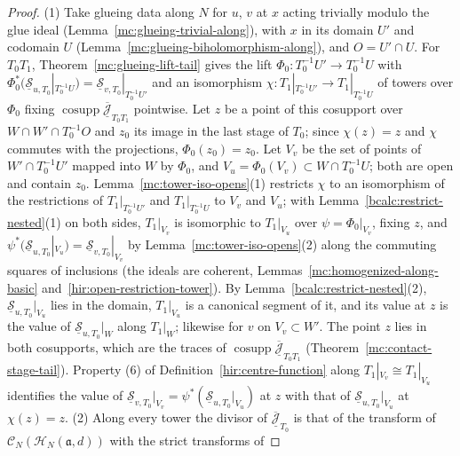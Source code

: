 \begin{proof}
\leanok
(1) Take glueing data along \(N\) for \(u\), \(v\) at \(x\) acting trivially modulo the glue ideal (Lemma~\ref{mc:glueing-trivial-along}), with \(x\) in its domain \(U'\) and
codomain \(U\) (Lemma~\ref{mc:glueing-biholomorphism-along}), and \(O=U'\cap U\). For \(T_0T_1\), Theorem~\ref{mc:glueing-lift-tail} gives the lift
\(\Phi_0\colon T_0^{-1}U'\to T_0^{-1}U\) with \(\Phi_0^*(\underline{\mathcal S}_{u,T_0}|_{T_0^{-1}U})=\underline{\mathcal S}_{v,T_0}|_{T_0^{-1}U'}\) and an isomorphism
\(\chi\colon T_1|_{T_0^{-1}U'}\to T_1|_{T_0^{-1}U}\) of towers over \(\Phi_0\) fixing \(\operatorname{cosupp}\overline{\underline{\mathcal J}}_{T_0T_1}\) pointwise. Let \(z\) be a
point of this cosupport over \(W\cap W'\cap T_0^{-1}O\) and \(z_0\) its image in the last stage of \(T_0\); since \(\chi(z)=z\) and \(\chi\) commutes with the projections,
\(\Phi_0(z_0)=z_0\). Let \(V_v\) be the set of points of \(W'\cap T_0^{-1}U'\) mapped into \(W\) by \(\Phi_0\), and \(V_u=\Phi_0(V_v)\subset W\cap T_0^{-1}U\); both are open and
contain \(z_0\). Lemma~\ref{mc:tower-iso-opens}(1) restricts \(\chi\) to an isomorphism of the restrictions of \(T_1|_{T_0^{-1}U'}\) and \(T_1|_{T_0^{-1}U}\) to \(V_v\) and
\(V_u\); with Lemma~\ref{bcalc:restrict-nested}(1) on both sides, \(T_1|_{V_v}\) is isomorphic to \(T_1|_{V_u}\) over \(\psi=\Phi_0|_{V_v}\), fixing \(z\), and
\(\psi^*(\underline{\mathcal S}_{u,T_0}|_{V_u})=\underline{\mathcal S}_{v,T_0}|_{V_v}\) by Lemma~\ref{mc:tower-iso-opens}(2) along the commuting squares of inclusions (the ideals
are coherent, Lemmas~\ref{mc:homogenized-along-basic} and~\ref{hir:open-restriction-tower}). By Lemma~\ref{bcalc:restrict-nested}(2), \(\underline{\mathcal S}_{u,T_0}|_{V_u}\) lies in
the domain, \(T_1|_{V_u}\) is a canonical segment of it, and its value at \(z\) is the value of \(\underline{\mathcal S}_{u,T_0}|_W\) along \(T_1|_W\); likewise for \(v\) on
\(V_v\subset W'\). The point \(z\) lies in both cosupports, which are the traces of \(\operatorname{cosupp}\overline{\underline{\mathcal J}}_{T_0T_1}\)
(Theorem~\ref{mc:contact-stage-tail}). Property (6) of Definition~\ref{hir:centre-function} along \(T_1|_{V_v}\cong T_1|_{V_u}\) identifies the value of
\(\underline{\mathcal S}_{v,T_0}|_{V_v}=\psi^*(\underline{\mathcal S}_{u,T_0}|_{V_u})\) at \(z\) with that of \(\underline{\mathcal S}_{u,T_0}|_{V_u}\) at \(\chi(z)=z\).
(2) Along every tower the divisor of \(\overline{\underline{\mathcal J}}_{T_0}\) is that of the transform of \(\mathcal C_N(\mathcal H_N(\mathfrak a,d))\) with the strict transforms of

\end{proof}

